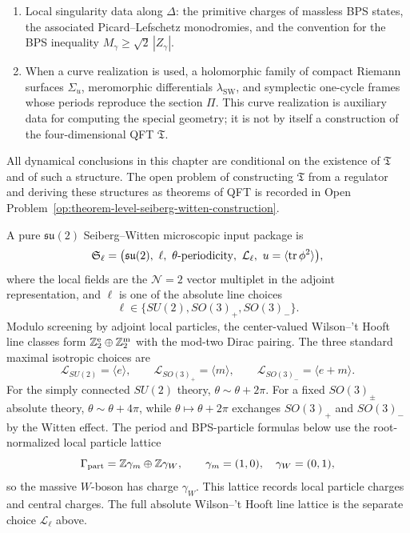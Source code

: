 \begin{hypothesis}
\begin{enumerate}[label=\textnormal{(\roman*)}]
\item Local singularity data along \(\Delta\): the primitive charges of
  massless BPS states, the associated Picard--Lefschetz monodromies, and the
  convention for the BPS inequality
  \(M_\gamma\ge\sqrt2\,|Z_\gamma|\).
\item When a curve realization is used, a holomorphic family of compact
  Riemann surfaces \(\Sigma_u\), meromorphic differentials
  \(\lambda_{\mathrm{SW}}\), and symplectic one-cycle frames whose periods
  reproduce the section \(\Pi\).  This curve realization is auxiliary data
  for computing the special geometry; it is not by itself a construction of
  the four-dimensional QFT \(\mathfrak T\).
\end{enumerate}
All dynamical conclusions in this chapter are conditional on the existence of
\(\mathfrak T\) and of such a structure.  The open problem of constructing
\(\mathfrak T\) from a regulator and deriving these structures as theorems of QFT
is recorded in Open Problem~\ref{op:theorem-level-seiberg-witten-construction}.
\end{hypothesis}

\begin{definition}
\label{def:pure-su2-sw-global-line-datum}
A pure \(\mathfrak{su}(2)\) Seiberg--Witten microscopic input package is
\[
  \mathfrak S_\ell
  =
  \bigl(
    \mathfrak{su}(2),\ \ell,\ \theta\hbox{-periodicity},\
    \mathcal L_\ell,\ u=\langle\operatorname{tr}\phi^2\rangle
  \bigr),
\]
where the local fields are the \(\mathcal N=2\) vector multiplet in the adjoint
representation, and \(\ell\) is one of the absolute line choices
\[
  \ell\in\{SU(2),SO(3)_+,SO(3)_-\}.
\]
Modulo screening by adjoint local particles, the center-valued Wilson--'t Hooft
line classes form \(\mathbb Z_2^{\rm e}\oplus\mathbb Z_2^{\rm m}\) with the
mod-two Dirac pairing.  The three standard maximal isotropic choices are
\[
  \mathcal L_{SU(2)}=\langle e\rangle,\qquad
  \mathcal L_{SO(3)_+}=\langle m\rangle,\qquad
  \mathcal L_{SO(3)_-}=\langle e+m\rangle .
\]
For the simply connected \(SU(2)\) theory, \(\theta\sim\theta+2\pi\).  For a
fixed \(SO(3)_\pm\) absolute theory, \(\theta\sim\theta+4\pi\), while
\(\theta\mapsto\theta+2\pi\) exchanges \(SO(3)_+\) and \(SO(3)_-\) by the
Witten effect.  The period and BPS-particle formulas below use the
root-normalized local particle lattice
\[
  \Gamma_{\rm part}=\mathbb Z\gamma_m\oplus\mathbb Z\gamma_W,\qquad
  \gamma_m=(1,0),\quad \gamma_W=(0,1),
\]
so the massive \(W\)-boson has charge \(\gamma_W\).  This lattice records
local particle charges and central charges.  The full absolute Wilson--'t Hooft
line lattice is the separate choice \(\mathcal L_\ell\) above.
\end{definition}

